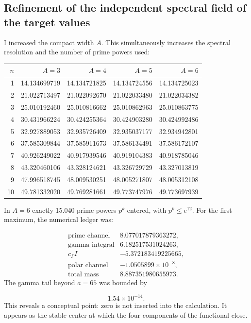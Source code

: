 \subsection{Refinement of the independent spectral field of the target values}
I increased the compact width \(A\). This simultaneously increases the spectral resolution and the number of prime powers used:\par
{}
\begin{center}
\small
\begin{tabularx}{\textwidth}{@{}RRRRR@{}}
\toprule
\(n\) & \(A=3\) & \(A=4\) & \(A=5\) & \(A=6\) \\
 & 14.134699719 & 14.134721825 & 14.134724556 & 14.134725023 \\
2 & 21.022713497 & 21.022092670 & 21.022033480 & 21.022034382 \\
3 & 25.010192460 & 25.010816662 & 25.010862963 & 25.010863775 \\
4 & 30.431966224 & 30.424255364 & 30.424903280 & 30.424992486 \\
5 & 32.927889053 & 32.935726409 & 32.935037177 & 32.934942801 \\
6 & 37.585309844 & 37.585911673 & 37.586134491 & 37.586172107 \\
7 & 40.926249022 & 40.917939546 & 40.919104383 & 40.918785046 \\
8 & 43.320460106 & 43.328124621 & 43.326729729 & 43.327013819 \\
9 & 47.996518745 & 48.009530251 & 48.005271807 & 48.005312108 \\
10 & 49.781332020 & 49.769281661 & 49.773747976 & 49.773697939 \\
\bottomrule
\end{tabularx}
\end{center}
In \(A=6\) exactly 15.040 prime powers \(p^k\) entered, with \(p^k\leq e^{12}\). For the first maximum, the numerical ledger was:\par
\[
\begin{array}{lr}
\text{prime channel} & 8.077017879363272,\\
\text{gamma integral} & 6.182517531024263,\\
c_\Gamma I & -5.372183419225665,\\
\text{polar channel} & -1.0505899\times10^{-8},\\ \hline
\text{total mass} & 8.887351980655973.
\end{array}
\]
The gamma tail beyond \(a=65\) was bounded by\par
\[
1.54\times10^{-14}.
\]
This reveals a conceptual point: zero is not inserted into the calculation.
It appears as the stable center at which the four components of the
functional close.\par
{}
